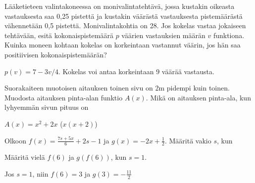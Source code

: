 \begin{tehtavasivu}
\begin{tehtava}
	Lääketieteen valintakoneessa on monivalintatehtävä, jossa kustakin oikeasta vastauksesta 	saa 0,25 pistettä ja kustakin väärästä vastauksesta pistemäärästä vähennetään 0,5				pistettä. Monivalintakohtia on 28. Jos kokelas vastaa jokaiseen tehtävään, esitä 				kokonaispistemäärä $p$ väärien vastauksien määrän $v$ funktiona. Kuinka moneen kohtaan 			kokelas on korkeintaan vastannut väärin, jos hän saa positiivisen kokonaispistemäärän?
	\begin{vastaus}
		$p(v) = 7-3v/4$. Kokelas voi antaa korkeintaan $9$ väärää vastausta.
	\end{vastaus}
	
\end{tehtava}


\begin{tehtava}
  Suorakaiteen muotoisen aitauksen toinen sivu on 2m pidempi kuin toinen.
  Muodosta aitauksen pinta-alan funktio $A(x)$.
  Mikä on aitauksen pinta-ala, kun lyhyemmän sivun pituus on
  \begin{alakohdat}
  \end{alakohdat}

  \begin{vastaus}
    $A(x) = x^2 + 2x$ ($x(x+2)$)
      \begin{alakohdat}
      \end{alakohdat}
  \end{vastaus}
\end{tehtava}

\begin{tehtava}
  Olkoon $f(x) = \frac{7s + 5x}{6} + 2s - 1$ ja $g(x) = -2x + \frac{1}{2}$. Määritä vakio $s$, kun
  \begin{alakohdat}
   \end{alakohdat}
   Määritä vielä $f(6)$ ja $g(f(6))$, kun $s=1$. 
  \begin{vastaus}
      \begin{alakohdat}
      \end{alakohdat}
   Jos $s=1$, niin $f(6) = 3$ ja $g(3) = -\frac{11}{2}$
  \end{vastaus}
\end{tehtava}


\end{tehtavasivu}

